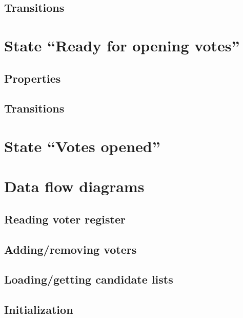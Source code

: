 \subsection{Transitions}\label{sec4:transitions6}

\section{State ``Ready for opening votes''}\label{sec4:ready-opening-polls}

\subsection{Properties}\label{sec4:properties7}

\subsection{Transitions}\label{sec4:transitions7}

\section{State ``Votes opened''}\label{sec4:state-polls-opened}

\section{Data flow diagrams}\label{sec4:data-flow-diagrams}

\subsection{Reading voter register}\label{sec4:read-voter-regist}

\subsection{Adding/removing voters}\label{sec4:addingr-voters}

\subsection{Loading/getting candidate lists}\label{sec4:load-cand-lists}

\subsection{Initialization}\label{sec4:initialization}

